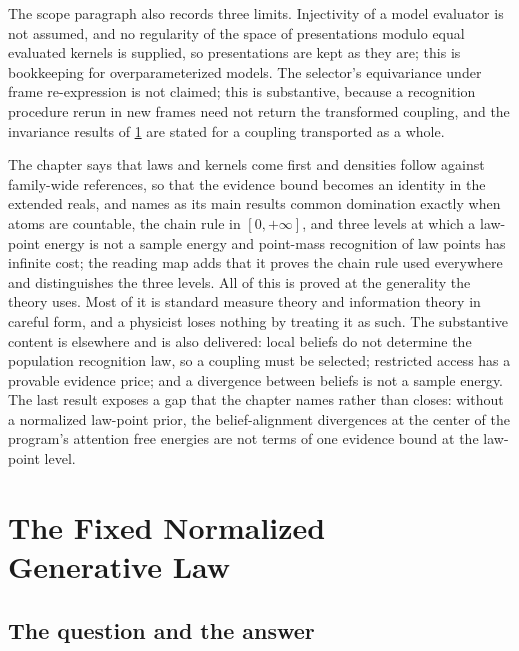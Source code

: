 The scope paragraph also records three limits. Injectivity of a model evaluator is not assumed, and no regularity
of the space of presentations modulo equal evaluated kernels is supplied, so presentations are kept as they are;
this is bookkeeping for overparameterized models. The selector's equivariance under frame re-expression is not
claimed; this is substantive, because a recognition procedure rerun in new frames need not return the
transformed coupling, and the invariance results of \cref{comp:ch04} are stated for a coupling transported as a
whole.

\begin{verdictbox}{\DELIVERED}
The chapter says that laws and kernels come first and densities follow against family-wide references, so that
the evidence bound becomes an identity in the extended reals, and names as its main results common domination
exactly when atoms are countable, the chain rule in $[0,+\infty]$, and three levels at which a law-point energy
is not a sample energy and point-mass recognition of law points has infinite cost; the reading map adds that it
proves the chain rule used everywhere and distinguishes the three levels. All of this is proved at the generality
the theory uses. Most of it is standard measure theory and information theory in careful form, and a physicist
loses nothing by treating it as such. The substantive content is elsewhere and is also delivered: local beliefs
do not determine the population recognition law, so a coupling must be selected; restricted access has a
provable evidence price; and a divergence between beliefs is not a sample energy. The last result exposes a gap
that the chapter names rather than closes: without a normalized law-point prior, the belief-alignment divergences
at the center of the program's attention free energies are not terms of one evidence bound at the law-point
level.
\end{verdictbox}


\chapter[The Fixed Normalized Generative Law]{The Fixed Normalized\\Generative Law}
\label{comp:ch04}

\section{The question and the answer}
\label{comp:ch04-question}

